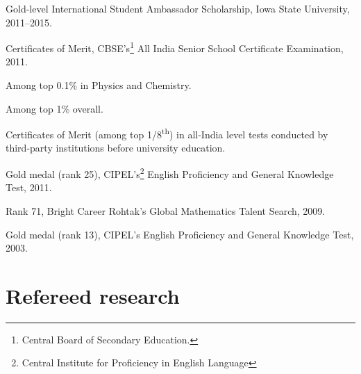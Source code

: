 \documentclass[11pt,article,oneside]{memoir}
\begin{document}
\begin{etaremune}
\normalsize

\item Gold-level International Student Ambassador Scholarship, Iowa State University, 2011--2015.

\item Certificates of Merit, CBSE's\footnote{Central Board of Secondary Education.} All India Senior School Certificate Examination, 2011.

\ind \hspace{0.35in} \footnotesize Among top 0.1\% in Physics and Chemistry.

\vspace{-0.5em}
\ind \hspace{0.35in} Among top 1\% overall.

\normalsize

\item Certificates of Merit (among top 1/8\textsuperscript{th}) in all-India level tests conducted by third-party institutions before university education.

	\ind \hspace{0.35in} \footnotesize Gold medal (rank 25), CIPEL's\footnote{Central Institute for Proficiency in English Language} English Proficiency and General Knowledge Test, 2011.
	
	\vspace{-0.25em}
	\ind \hspace{0.35in} Rank 71, Bright Career Rohtak's Global Mathematics Talent Search, 2009.
	
	\vspace{-0.25em}
	\ind \hspace{0.35in} Gold medal (rank 13), CIPEL's English Proficiency and General Knowledge Test, 2003.

\normalsize

\end{etaremune}

\def\labelprefix{J}

\newpage
\section{Refereed research}

\medskip
\end{document}
